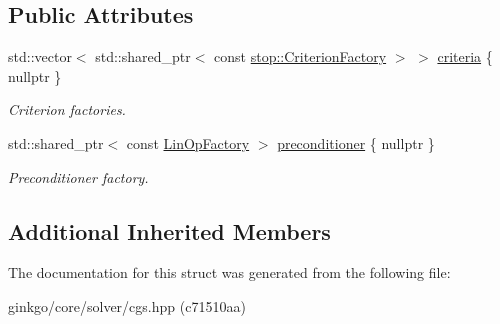 \subsection*{Public Attributes}
\begin{DoxyCompactItemize}
\item 
\mbox{\label{structgko_1_1solver_1_1Cgs_1_1parameters__type_a02051dffae27205cd269beeaa29f8163}} 
std\+::vector$<$ std\+::shared\+\_\+ptr$<$ const \hyperlink{group__stop_gab12a51109c50b35ec36dc5a393d6a9a0}{stop\+::\+Criterion\+Factory} $>$ $>$ \hyperlink{structgko_1_1solver_1_1Cgs_1_1parameters__type_a02051dffae27205cd269beeaa29f8163}{criteria} \{ nullptr \}
\begin{DoxyCompactList}\small\item\em Criterion factories. \end{DoxyCompactList}\item 
\mbox{\label{structgko_1_1solver_1_1Cgs_1_1parameters__type_abbe93702c7bcb93bc1d831d6b947a0f9}} 
std\+::shared\+\_\+ptr$<$ const \hyperlink{classgko_1_1LinOpFactory}{Lin\+Op\+Factory} $>$ \hyperlink{structgko_1_1solver_1_1Cgs_1_1parameters__type_abbe93702c7bcb93bc1d831d6b947a0f9}{preconditioner} \{ nullptr \}
\begin{DoxyCompactList}\small\item\em Preconditioner factory. \end{DoxyCompactList}\end{DoxyCompactItemize}
\subsection*{Additional Inherited Members}


The documentation for this struct was generated from the following file\+:\begin{DoxyCompactItemize}
\item 
ginkgo/core/solver/cgs.\+hpp (c71510aa)\end{DoxyCompactItemize}
